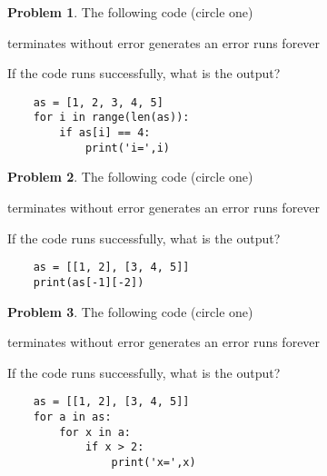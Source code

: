 \documentclass[10pt]{article}
\theoremstyle{definition}
\newtheorem{problem}{Problem}
\begin{document}
\begin{problem}
    The following code (circle one)

    \vspace{0.25in}
    \hspace{0.5in}terminates without error 
    \hspace{1in}generates an error
    \hspace{1in}runs forever
    \vspace{0.25in}

    \noindent
    If the code runs successfully, what is the output?
\end{problem}
\begin{lstlisting}
    as = [1, 2, 3, 4, 5]
    for i in range(len(as)):
        if as[i] == 4:
            print('i=',i)
\end{lstlisting}
\vspace{1.5in}

\newpage
\begin{problem}
    The following code (circle one)

    \vspace{0.25in}
    \hspace{0.5in}terminates without error 
    \hspace{1in}generates an error
    \hspace{1in}runs forever
    \vspace{0.25in}

    \noindent
    If the code runs successfully, what is the output?
\end{problem}
\begin{lstlisting}
    as = [[1, 2], [3, 4, 5]]
    print(as[-1][-2])
\end{lstlisting}
\vspace{1.5in}

\begin{problem}
    The following code (circle one)

    \vspace{0.25in}
    \hspace{0.5in}terminates without error 
    \hspace{1in}generates an error
    \hspace{1in}runs forever
    \vspace{0.25in}

    \noindent
    If the code runs successfully, what is the output?
\end{problem}
\begin{lstlisting}
    as = [[1, 2], [3, 4, 5]]
    for a in as:
        for x in a:
            if x > 2:
                print('x=',x)
\end{lstlisting}
\vspace{1.5in}
\end{document}
